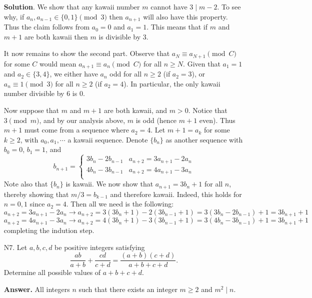 \documentclass[11pt,a4paper]{article}
\begin{document}
\begin{enumerate}
    	\textbf{Solution}. 
    	We show that any kawaii number $m$ cannot have $3\mid m - 2$. 
    	To see why, if $a_n, a_{n-1}\in \{0, 1\}\pmod{3}$ then $a_{n+1}$ will also have this property. 
    	Thus the claim follows from $a_0=0$ and $a_1=1$. 
    	This means that if $m$ and $m+1$ are both kawaii then 
    	$m$ is divisible by 3. 
    	
    	It now remains to show the second part. 
    	Observe that $a_N\equiv a_{N+1}\pmod C$ for some $C$ would mean 
    	$a_{n+1}\equiv a_n\pmod{C}$ for all $n\ge N$. 
    	Given that $a_1=1$ and $a_2\in \{3, 4\}$, 
    	we either have $a_n$ odd for all $n\ge 2$ (if $a_2=3$), 
    	or $a_n\equiv 1\pmod{3}$ for all $n\ge 2$ (if $a_2=4$). 
    	In particular, the only kawaii number divisible by 6 is 0. 
    	
    	Now suppose that $m$ and $m + 1$ are both kawaii, 
    	and $m > 0$. 
    	Notice that $3\pmod m$, and by our analysis above, $m$ is odd 
    	(hence $m + 1$ even). 
    	Thus $m + 1$ must come from a sequence where $a_2 = 4$. 
    	Let $m + 1 = a_k$ for some $k\ge 2$, with $a_0, a_1, \cdots$ a kawaii sequence. 
    	Denote $\{b_n\}$ as another sequence with $b_0 = 0$, $b_1 = 1$, 
    	and 
    	\[
    	b_{n+1} = 
    	\begin{cases}
    		3b_{n} - 2b_{n - 1} & a_{n+2} = 3a_{n + 1} - 2a_{n}\\
    		4b_{n} - 3b_{n - 1} & a_{n+2} = 4a_{n + 1} - 3a_{n}\\
    	\end{cases}
    	\]
    	Note also that $\{b_n\}$ is kawaii. 
    	We now show that $a_{n+1} = 3b_n + 1$ for all $n$, 
    	thereby showing that $m / 3 = b_{k - 1}$ and therefore kawaii. 
    	Indeed, this holds for $n = 0, 1$ since $a_2 = 4$. 
    	Then all we need is the following:
    	\[
    	a_{n+2} = 3a_{n + 1} - 2a_{n}
    	\to a_{n + 2} = 3(3b_n + 1) - 2(3b_{n-1}+ 1) = 3(3b_n - 2b_{n-1}) + 1
    	= 3b_{n+1} + 1
    	\]
    	\[
    	a_{n+2} = 4a_{n + 1} - 3a_{n}
    	\to a_{n + 2} = 4(3b_n + 1) - 3(3b_{n-1}+ 1) = 3(4b_n - 3b_{n-1}) + 1
    	= 3b_{n+1} + 1
    	\]
    	completing the indution step. 
    	
    	\item [N7.]
    	Let $a,b,c,d$ be positive integers satisfying\[\frac{ab}{a+b}+\frac{cd}{c+d}=\frac{(a+b)(c+d)}{a+b+c+d}.\]Determine all possible values of $a+b+c+d$.
    	
    	\textbf{Answer.} All integers $n$ such that there exists an integer $m\ge 2$ and $m^2\mid n$. 
    	

\end{enumerate}
\end{document}
